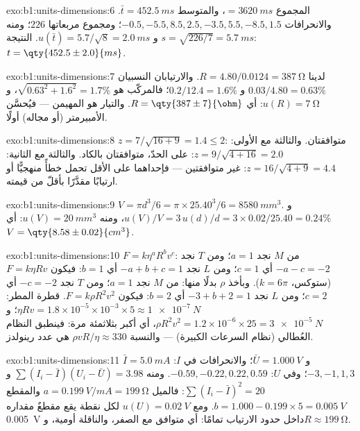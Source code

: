 \begin{solution}{exo:b1:units-dimensions:6}
المجموع $= \qty{3620}{ms}$، والمتوسط $\bar t = \qty{452.5}{ms}$. والانحرافات
$-0.5, -5.5, 8.5, 2.5, -3.5, 5.5, -8.5, 1.5$؛ ومجموع مربعاتها $226$؛
ومنه $s = \sqrt{226/7} = \qty{5.7}{ms}$ و $u(\bar t) = 5.7/\sqrt8 = \qty{2.0}{ms}$.
النتيجة: $t = \qty{452.5\pm2.0}{ms}$.
\end{solution}

\begin{solution}{exo:b1:units-dimensions:7}
لدينا $R = 4.80/0.0124 = \qty{387}{\ohm}$. والارتيابان النسبيان
$0.03/4.80 = 0.63\%$ و $0.2/12.4 = 1.6\%$؛ فالمركّب هو
$\sqrt{0.63^2 + 1.6^2} = 1.7\%$، و
$u(R) = \qty{7}{\ohm}$: أي $R = \qty{387\pm7}{\ohm}$. والتيار هو
المهيمن --- فيُحسَّن الأمبيرمتر (أو مجاله) أولًا.
\end{solution}

\begin{solution}{exo:b1:units-dimensions:8}
$z = 7/\sqrt{16 + 9} = 1.4 \leq 2$: متوافقتان.
والثالثة مع الأولى: $z = 9/\sqrt{4 + 16} = 2.0$: على الحدّ، متوافقتان
بالكاد. والثالثة مع الثانية: $z = 16/\sqrt{4 + 9} = 4.4$: غير متوافقتين
--- فإحداهما على الأقل تحمل خطأً منهجيًّا أو ارتيابًا مقدَّرًا بأقلّ من
قيمته.
\end{solution}

\begin{solution}{exo:b1:units-dimensions:9}
$V = \pi d^3/6 = \pi \times 25.40^3/6 = \qty{8580}{mm^3}$.
و$u(V)/V = 3\,u(d)/d = 3 \times 0.02/25.40 = 0.24\%$،
ومنه $u(V) = \qty{20}{mm^3}$: أي $V = \qty{8.58\pm0.02}{cm^3}$.
\end{solution}

\begin{solution}{exo:b1:units-dimensions:10}
$F = k\eta^a R^b v^c$: من $M$ نجد $a = 1$؛ ومن $T$ نجد $-a - c = -2$ أي $c = 1$؛
ومن $L$ نجد $-a + b + c = 1$ أي $b = 1$: فيكون $F = k\eta R v$ (ستوكس، $k = 6\pi$).
وبأخذ $\rho$ بدلًا منها: من $M$ نجد $a = 1$؛ ومن $T$ نجد $-c = -2$ أي $c = 2$؛ ومن $L$
نجد $-3 + b + 2 = 1$ أي $b = 2$: فيكون $F = k\rho R^2 v^2$.
قطرة المطر: $\eta R v = 1.8\times10^{-5} \times 10^{-3} \times 5 \approx
\qty{1e-7}{N}$؛ و$\rho R^2 v^2 = 1.2 \times 10^{-6} \times 25 =
\qty{3e-5}{N}$، أي أكبر بثلاثمئة مرة: فينطبق النظام العُطالي (نظام
السرعات الكبيرة) --- والنسبة $\rho v R/\eta \approx 330$ هي عدد
رينولدز.
\end{solution}

\begin{solution}{exo:b1:units-dimensions:11}
$\bar I = \qty{5.0}{mA}$ و $\bar U = \qty{1.000}{V}$؛ والانحرافات في $I$:
$-3, -1, 1, 3$؛ وفي $U$: $-0.59, -0.22, 0.22, 0.59$.
ومنه $\sum (I_i - \bar I)(U_i - \bar U) = 3.98$ و $\sum (I_i - \bar I)^2 = 20$:
فالميل $a = \qty{0.199}{V/mA} = \qty{199}{\ohm}$ والمقطع $b = 1.000 - 0.199 \times 5 =
\qty{0.005}{V}$. ومع $u(U) = \qty{0.02}{V}$ لكل نقطة يقع مقطعٌ مقداره
\qty{0.005}{V} داخل حدود الارتياب تمامًا: أي متوافق مع الصفر، والناقلة
أومية، و$R \approx \qty{199}{\ohm}$.
\end{solution}

